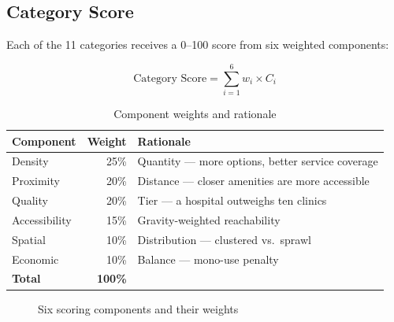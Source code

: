 \documentclass[11pt,a4paper]{article}
\begin{document}
\subsection{Category Score}

Each of the 11 categories receives a 0--100 score from six weighted components:

\begin{equation}
\text{Category Score} = \sum_{i=1}^{6} w_i \times C_i
\end{equation}

\begin{table}[H]
\centering
\caption{Component weights and rationale}
\begin{tabular}{@{}lrl@{}}
\toprule
\textbf{Component} & \textbf{Weight} & \textbf{Rationale} \\ \midrule
Density       & 25\% & Quantity --- more options, better service coverage \\
Proximity     & 20\% & Distance --- closer amenities are more accessible \\
Quality       & 20\% & Tier --- a hospital outweighs ten clinics \\
Accessibility & 15\% & Gravity-weighted reachability \\
Spatial       & 10\% & Distribution --- clustered vs.\ sprawl \\
Economic      & 10\% & Balance --- mono-use penalty \\ \midrule
\textbf{Total}& \textbf{100\%} & \\ \bottomrule
\end{tabular}
\end{table}

\begin{figure}[H]
\centering
{}
\caption{Six scoring components and their weights}
\end{figure}
\end{document}
